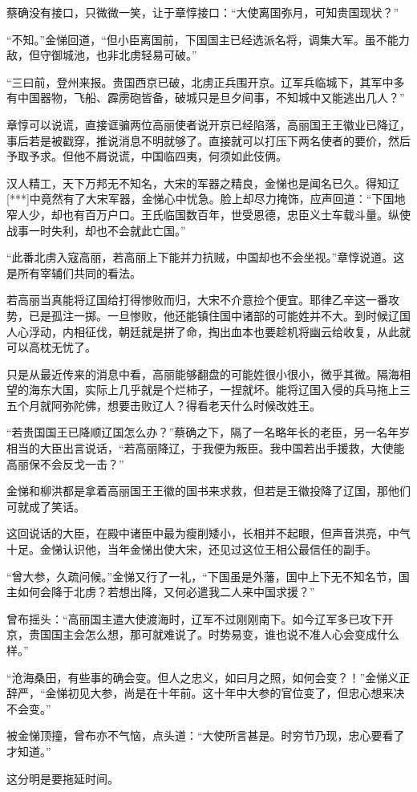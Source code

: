 蔡确没有接口，只微微一笑，让于章惇接口：“大使离国弥月，可知贵国现状？”

“不知。”金悌回道，“但小臣离国前，下国国主已经选派名将，调集大军。虽不能力敌，但守御城池，也非北虏轻易可破。”

“三曰前，登州来报。贵国西京已破，北虏正兵围开京。辽军兵临城下，其军中多有中国器物，飞船、霹雳砲皆备，破城只是旦夕间事，不知城中又能逃出几人？”

章惇可以说谎，直接诓骗两位高丽使者说开京已经陷落，高丽国王王徽业已降辽，事后若是被戳穿，推说消息不明就够了。直接就可以打压下两名使者的要价，然后予取予求。但他不屑说谎，中国临四夷，何须如此伎俩。

汉人精工，天下万邦无不知名，大宋的军器之精良，金悌也是闻名已久。得知辽[***]中竟然有了大宋军器，金悌心中忧急。脸上却尽力掩饰，应声回道：“下国地窄人少，却也有百万户口。王氏临国数百年，世受恩德，忠臣义士车载斗量。纵使战事一时失利，却也不会就此亡国。”

“此番北虏入寇高丽，若高丽上下能并力抗贼，中国却也不会坐视。”章惇说道。这是所有宰辅们共同的看法。

若高丽当真能将辽国给打得惨败而归，大宋不介意捡个便宜。耶律乙辛这一番攻势，已是孤注一掷。一旦惨败，他还能镇住国中诸部的可能姓并不大。到时候辽国人心浮动，内相征伐，朝廷就是拼了命，掏出血本也要趁机将幽云给收复，从此就可以高枕无忧了。

只是从最近传来的消息中看，高丽能够翻盘的可能姓很小很小，微乎其微。隔海相望的海东大国，实际上几乎就是个烂柿子，一捏就坏。能将辽国入侵的兵马拖上三五个月就阿弥陀佛，想要击败辽人？得看老天什么时候改姓王。

“若贵国国王已降顺辽国怎么办？”蔡确之下，隔了一名略年长的老臣，另一名年岁相当的大臣出言说话，“若高丽降辽，于我便为叛臣。我中国若出手援救，大使能高丽保不会反戈一击？”

金悌和柳洪都是拿着高丽国王王徽的国书来求救，但若是王徽投降了辽国，那他们可就成了笑话。

这回说话的大臣，在殿中诸臣中最为瘦削矮小，长相并不起眼，但声音洪亮，中气十足。金悌认识他，当年金悌出使大宋，还见过这位王相公最信任的副手。

“曾大参，久疏问候。”金悌又行了一礼，“下国虽是外藩，国中上下无不知名节，国主如何会降于北虏？若想出降，又何必遣我二人来中国求援？”

曾布摇头：“高丽国主遣大使渡海时，辽军不过刚刚南下。如今辽军多已攻下开京，贵国国主会怎么想，那可就难说了。时势易变，谁也说不准人心会变成什么样。”

“沧海桑田，有些事的确会变。但人之忠义，如曰月之照，如何会变？！”金悌义正辞严，“金悌初见大参，尚是在十年前。这十年中大参的官位变了，但忠心想来决不会变。”

被金悌顶撞，曾布亦不气恼，点头道：“大使所言甚是。时穷节乃现，忠心要看了才知道。”

这分明是要拖延时间。

